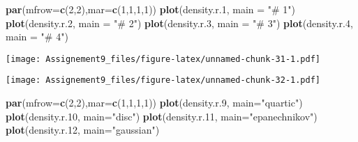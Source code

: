 \documentclass[]{article}
\newenvironment{Shaded}{\begin{snugshade}}{\end{snugshade}}
\newcommand{\DataTypeTok}[1]{\textcolor[rgb]{0.13,0.29,0.53}{#1}}
\newcommand{\DecValTok}[1]{\textcolor[rgb]{0.00,0.00,0.81}{#1}}
\newcommand{\FloatTok}[1]{\textcolor[rgb]{0.00,0.00,0.81}{#1}}
\newcommand{\KeywordTok}[1]{\textcolor[rgb]{0.13,0.29,0.53}{\textbf{#1}}}
\newcommand{\NormalTok}[1]{#1}
\newcommand{\StringTok}[1]{\textcolor[rgb]{0.31,0.60,0.02}{#1}}
\begin{document}
\begin{Shaded}
\begin{Highlighting}[]
\KeywordTok{par}\NormalTok{(}\DataTypeTok{mfrow=}\KeywordTok{c}\NormalTok{(}\DecValTok{2}\NormalTok{,}\DecValTok{2}\NormalTok{),}\DataTypeTok{mar=}\KeywordTok{c}\NormalTok{(}\DecValTok{1}\NormalTok{,}\DecValTok{1}\NormalTok{,}\DecValTok{1}\NormalTok{,}\DecValTok{1}\NormalTok{))}
\KeywordTok{plot}\NormalTok{(density.r}\FloatTok{.1}\NormalTok{, }\DataTypeTok{main =} \StringTok{"# 1"}\NormalTok{)}
\KeywordTok{plot}\NormalTok{(density.r}\FloatTok{.2}\NormalTok{, }\DataTypeTok{main =} \StringTok{"# 2"}\NormalTok{)}
\KeywordTok{plot}\NormalTok{(density.r}\FloatTok{.3}\NormalTok{, }\DataTypeTok{main =} \StringTok{"# 3"}\NormalTok{)}
\KeywordTok{plot}\NormalTok{(density.r}\FloatTok{.4}\NormalTok{, }\DataTypeTok{main =} \StringTok{"# 4"}\NormalTok{)}
\end{Highlighting}
\end{Shaded}

\texttt{[image: Assignement9\_files/figure-latex/unnamed-chunk-31-1.pdf]}

\begin{Shaded}
\end{Shaded}

\texttt{[image: Assignement9\_files/figure-latex/unnamed-chunk-32-1.pdf]}

\begin{Shaded}
\begin{Highlighting}[]
\KeywordTok{par}\NormalTok{(}\DataTypeTok{mfrow=}\KeywordTok{c}\NormalTok{(}\DecValTok{2}\NormalTok{,}\DecValTok{2}\NormalTok{),}\DataTypeTok{mar=}\KeywordTok{c}\NormalTok{(}\DecValTok{1}\NormalTok{,}\DecValTok{1}\NormalTok{,}\DecValTok{1}\NormalTok{,}\DecValTok{1}\NormalTok{))}
\KeywordTok{plot}\NormalTok{(density.r}\FloatTok{.9}\NormalTok{, }\DataTypeTok{main=}\StringTok{"quartic"}\NormalTok{)}
\KeywordTok{plot}\NormalTok{(density.r}\FloatTok{.10}\NormalTok{, }\DataTypeTok{main=}\StringTok{"disc"}\NormalTok{)}
\KeywordTok{plot}\NormalTok{(density.r}\FloatTok{.11}\NormalTok{, }\DataTypeTok{main=}\StringTok{"epanechnikov"}\NormalTok{)}
\KeywordTok{plot}\NormalTok{(density.r}\FloatTok{.12}\NormalTok{, }\DataTypeTok{main=}\StringTok{"gaussian"}\NormalTok{)}
\end{Highlighting}
\end{Shaded}
\end{document}
